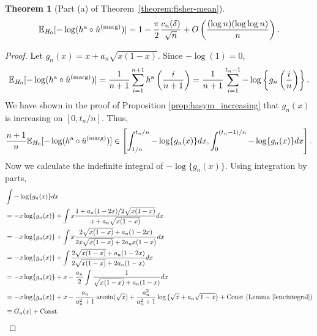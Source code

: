 \documentclass[11pt]{article}
\newtheorem{thm}{Theorem}
\def\E{\mathbb{E}}
\def\marg{\textnormal{(marg)}}
\def\asym{\textnormal{a}}
\newcommand{\lb}{\left(}
\newcommand{\rb}{\right)}
\begin{document}
\begin{thm}[Part (a) of Theorem~\ref{theorem:fisher-mean}]\label{thm:fisher_asym}
  \[\E_{H_0}[-\log (h^\asym \circ \hat{u}^\marg)] = 1 - \frac{\pi}{2}\frac{c_n(\delta)}{\sqrt{n}} + O\lb \frac{(\log n)(\log \log n)}{n}\rb.\]
\end{thm}
\begin{proof}
  Let $g_n(x) = x + a_n \sqrt{x(1 - x)}$. Since $-\log(1) = 0$, 
  \[\E_{H_0}[-\log (h^\asym \circ \hat{u}^\marg)] = \frac{1}{n+1}\sum_{i=1}^{n+1}h^\asym\lb\frac{i}{n+1}\rb = \frac{1}{n+1}\sum_{i=1}^{t_n - 1} -\log \left\{g_n\lb\frac{i}{n}\rb\right\}.\]
  We have shown in the proof of Proposition \ref{prop:hasym_increasing} that $g_n(x)$ is increasing on $[0, t_n / n]$. Thus,
  \begin{equation}
    \label{eq:integral_bound}
    \frac{n+1}{n}\E_{H_0}[-\log (h^\asym \circ \hat{u}^\marg)]\in \left[\int_{1/n}^{t_n / n}-\log \{g_n(x)\}dx, \int_{0}^{(t_n - 1) / n}-\log \{g_n(x)\}dx\right].
  \end{equation}
  Now we calculate the indefinite integral of $-\log\{g_n(x)\}$. Using integration by parts,
  \begin{align*}
    &\int -\log \{g_n(x)\}dx\\
    &= -x\log \{g_n(x)\} + \int x\frac{1 + a_n (1 - 2x) / 2\sqrt{x(1- x)}}{x + a_n\sqrt{x(1 - x)}}dx\\
    &= -x\log \{g_n(x)\} + \int x\frac{ 2\sqrt{x(1- x)} + a_n (1 - 2x)}{2x\sqrt{x(1- x)} + 2a_n x(1 - x)}dx\\
    & = -x\log \{g_n(x)\} + \int\frac{2\sqrt{x(1 - x)} + a_n (1 - 2x)}{2\sqrt{x(1 - x)} + 2a_n(1 - x)}dx\\
    & = -x\log \{g_n(x)\} + x - \frac{a_n}{2}\int\frac{1}{\sqrt{x(1 - x)} + a_n(1 - x)}dx\\
    & = -x\log \{g_n(x)\} + x - \frac{a_n}{a_n^2 + 1}\arcsin(\sqrt{x}) + \frac{a_n^2}{a_n^2 + 1}\log\lb \sqrt{x} + a_n\sqrt{1 - x}\rb + \mathrm{Const} \,\,\text{(Lemma \ref{lem:integral})}\\
    & \equiv G_n(x) + \mathrm{Const}.
  \end{align*}

\end{proof}
\end{document}
